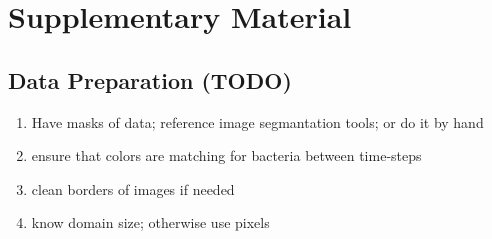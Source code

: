 \documentclass{article}
\begin{document}
\section{Supplementary Material}

\subsection{Data Preparation (TODO)}
\begin{enumerate}
    \item Have masks of data; reference image segmantation tools; or do it by hand
    \item ensure that colors are matching for bacteria between time-steps
    \item clean borders of images if needed
    \item know domain size; otherwise use pixels
\end{enumerate}

\end{document}
